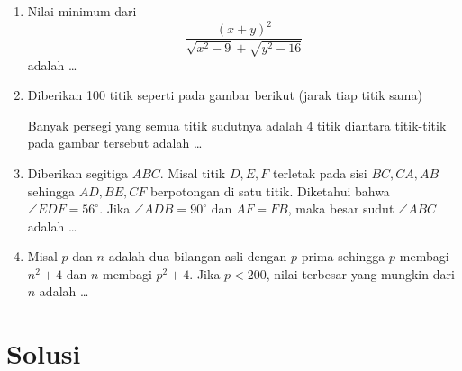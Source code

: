 \begin{enumerate}[resume]
\item Nilai minimum dari
$$\dfrac{(x+y)^2}{\sqrt{x^2-9}+\sqrt{y^2-16}}$$
adalah \dots

\item Diberikan 100 titik seperti pada gambar berikut (jarak tiap titik sama)
\begin{center}
\end{center}
Banyak persegi yang semua titik sudutnya adalah 4 titik diantara titik-titik pada gambar tersebut adalah \dots

\item Diberikan segitiga $ABC$. Misal titik $D,E,F$ terletak pada sisi $BC,CA,AB$ sehingga $AD,BE,CF$ berpotongan di satu titik. Diketahui bahwa $\angle EDF = 56^\circ$. Jika $\angle ADB = 90^\circ$ dan $AF=FB$, maka besar sudut $\angle ABC$ adalah \dots

\item Misal $p$ dan $n$ adalah dua bilangan asli dengan $p$ prima sehingga $p$ membagi $n^2+4$ dan $n$ membagi $p^2+4$. Jika $p<200$, nilai terbesar yang mungkin dari $n$ adalah \dots
\end{enumerate}

\newpage
\section{Solusi}

